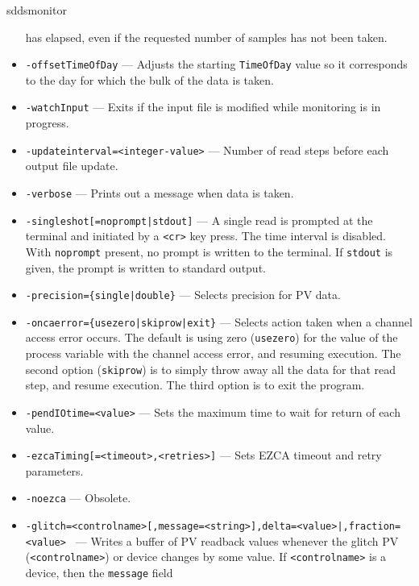 \begin{sddsprog}{sddsmonitor}
\begin{itemize}
                has elapsed, even if the requested number of samples has not been taken.
        \item {\tt -offsetTimeOfDay} --- Adjusts the starting \verb+TimeOfDay+ value so it corresponds
                to the day for which the bulk of the data is taken.
        \item {\tt -watchInput} --- Exits if the input file is modified while monitoring is in progress.
        \item {\tt -updateinterval=<integer-value>} --- Number of read steps before each output file update.
        \item {\tt -verbose} --- Prints out a message when data is taken.
        \item {\verb+-singleshot[=noprompt|stdout]+} --- A single read is prompted at the terminal
                and initiated by a \verb+<cr>+ key press. The time interval is disabled.
                With \verb+noprompt+ present, no prompt is written to the terminal. If \verb+stdout+
                is given, the prompt is written to standard output.
        \item {\verb+-precision={single|double}+} --- Selects precision for PV data.
        \item {\verb+-oncaerror={usezero|skiprow|exit}+} --- Selects action taken when a channel access error occurs.
                The default is using zero (\verb+usezero+) for the value of the process variable
                with the channel access error, and resuming execution. The second option (\verb+skiprow+) is to
                simply throw away all the data for that read step, and resume execution.
                The third option is to exit the program.
        \item {\tt -pendIOtime=<value>} --- Sets the maximum time to wait for return of each value.
        \item {\tt -ezcaTiming[=<timeout>,<retries>]} --- Sets EZCA timeout and retry parameters.
        \item {\tt -noezca} --- Obsolete.
        \item {\tt -glitch=<controlname>[,message=<string>]{,delta=<value>|,fraction=<value>} \newline
[,before=<number>][,after=<number>][,{baseline=<number>|filterFraction=<value>}][,sign={+|-}][,noReset][,{autoHoldoff|holdoff=<seconds>}]} ---
                Writes a buffer of PV readback values whenever the glitch PV (\verb+<controlname>+) or
                device changes by some value. If \verb+<controlname>+ is a device, then the \verb+message+ field

\end{itemize}
\end{sddsprog}
